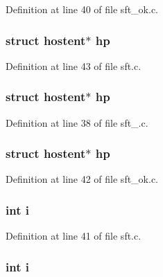 Definition at line 40 of file sft\_\-ok.c.

\hypertarget{group__tools_gaa0f575fa3882aa394cc287edba645a35}{
\subsubsection[{hp}]{\setlength{\rightskip}{0pt plus 5cm}struct hostent$\ast$ {\bf hp}}}
\label{group__tools_gaa0f575fa3882aa394cc287edba645a35}


Definition at line 43 of file sft.c.

\hypertarget{group__tools_gaa0f575fa3882aa394cc287edba645a35}{
\subsubsection[{hp}]{\setlength{\rightskip}{0pt plus 5cm}struct hostent$\ast$ {\bf hp}}}
\label{group__tools_gaa0f575fa3882aa394cc287edba645a35}


Definition at line 38 of file sft\_\-.c.

\hypertarget{group__tools_gaa0f575fa3882aa394cc287edba645a35}{
\subsubsection[{hp}]{\setlength{\rightskip}{0pt plus 5cm}struct hostent$\ast$ {\bf hp}}}
\label{group__tools_gaa0f575fa3882aa394cc287edba645a35}


Definition at line 42 of file sft\_\-ok.c.

\hypertarget{group__tools_gacb559820d9ca11295b4500f179ef6392}{
\subsubsection[{i}]{\setlength{\rightskip}{0pt plus 5cm}int {\bf i}}}
\label{group__tools_gacb559820d9ca11295b4500f179ef6392}


Definition at line 41 of file sft.c.

\hypertarget{group__tools_gacb559820d9ca11295b4500f179ef6392}{
\subsubsection[{i}]{\setlength{\rightskip}{0pt plus 5cm}int {\bf i}}}
\label{group__tools_gacb559820d9ca11295b4500f179ef6392}


